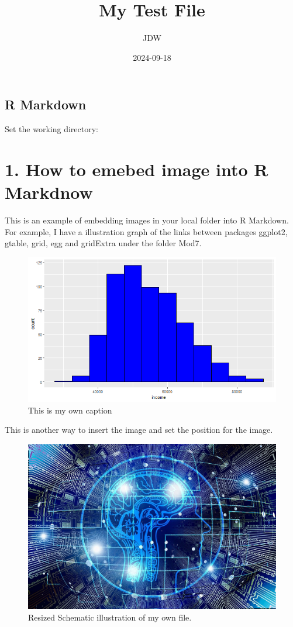 \documentclass[
]{article}
\title{My Test File}
\author{JDW}
\date{2024-09-18}
\begin{document}
\maketitle

\subsection{R Markdown}\label{r-markdown}

Set the working directory:

\section{1. How to emebed image into R
Markdnow}\label{how-to-emebed-image-into-r-markdnow}

This is an example of embedding images in your local folder into R
Markdown. For example, I have a illustration graph of the links between
packages ggplot2, gtable, grid, egg and gridExtra under the folder Mod7.

\begin{figure}
\centering
\includegraphics{Histogram_png.png}
\caption{This is my own caption}
\end{figure}

This is another way to insert the image and set the position for the
image.

\begin{figure}

{\centering \includegraphics[width=0.5\linewidth]{AI4} 

}

\caption{\label{fig:rein0}Resized Schematic illustration of my own file.}\label{fig:rein0}
\end{figure}
\end{document}
